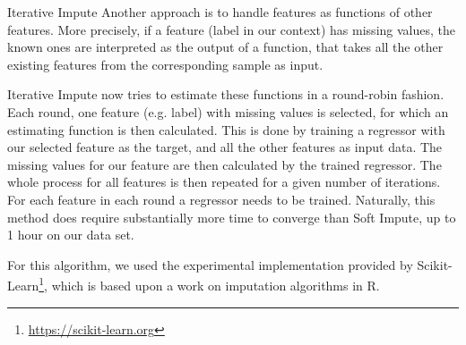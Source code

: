\begin{subsection}{Iterative Impute}
	Another approach is to handle features as functions of other features. More precisely, if a feature (label in our context) has missing values, the known ones are interpreted as the output of a function, that takes all the other existing features from the corresponding sample as input. \par
	Iterative Impute now tries to estimate these functions in a round-robin fashion. Each round, one feature (e.g. label) with missing values is selected, for which an estimating function is then calculated. This is done by training a regressor with our selected feature as the target, and all the other features as input data. The missing values for our feature are then calculated by the trained regressor. The whole process for all features is then repeated for a given number of iterations. For each feature in each round a regressor needs to be trained. Naturally, this method does require substantially more time to converge than Soft Impute, up to 1 hour on our data set. \par
	
	For this algorithm, we used the experimental implementation provided by Scikit-Learn\footnote{\href{https://scikit-learn.org/stable/}{https://scikit-learn.org}}, which is based upon a work on imputation algorithms in R. \cite{buuren2010mice}
\end{subsection}

